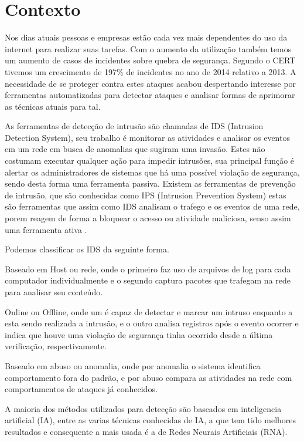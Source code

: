 \documentclass[
	12pt,				%
	openright,			%
	oneside,
	a4paper,			%
	english,			%
	french,				%
	spanish,			%
	brazil				%
	]{abntex2}
\begin{document}
\section{Contexto}

Nos dias atuais pessoas e empresas estão cada vez mais dependentes do uso da internet para realizar suas tarefas. Com o aumento da utilização também temos um aumento de casos de incidentes sobre quebra de segurança. Segundo o CERT \cite{CERT} tivemos um crescimento de 197\% de incidentes no ano de 2014 relativo a 2013. A necessidade de se proteger contra estes
ataques acabou despertando interesse por ferramentas automatizadas para detectar ataques e analisar formas de aprimorar as técnicas atuais para tal.

As ferramentas de detecção de intrusão são chamadas de IDS (Intrusion Detection System), seu trabalho é monitorar as atividades e analisar os eventos em um rede em busca de anomalias que sugiram uma invasão. Estes não costumam executar qualquer ação para impedir intrusões, sua principal função é alertar os administradores de sistemas que há uma possível violação de segurança, sendo desta forma uma ferramenta passiva.
Existem as ferramentas de prevenção de intrusão, que são conhecidas como IPS (Intrusion Prevention System) estas são ferramentas que assim como IDS analisam o trafego e os eventos de uma rede, porem reagem de forma a bloquear o acesso ou atividade maliciosa, senso assim uma ferramenta ativa .

Podemos classificar os IDS da seguinte forma.

Baseado em Host ou rede, onde o primeiro faz uso de arquivos de log para cada computador individualmente e o segundo captura pacotes que trafegam na rede para analisar seu conteúdo.

Online ou Offline, onde um é capaz de detectar e marcar um intruso enquanto a esta sendo realizada a intrusão, e o outro analisa registros após o evento ocorrer e indica que houve uma violação de segurança tinha ocorrido desde a última verificação, respectivamente.

Baseado em abuso ou anomalia, onde por anomalia o sistema identifica comportamento fora do padrão, e por abuso compara as atividades na rede com comportamentos de ataques já conhecidos.

A maioria dos métodos utilizados para detecção são baseados em inteligencia artificial (IA), entre as varias técnicas conhecidas de IA, a que tem tido melhores resultados e consequente a mais usada é a de Redes Neurais Artificiais (RNA)\cite{Jake-Ryan}\cite{Stampar}.
\end{document}
